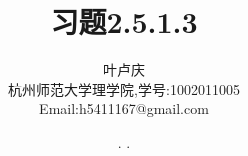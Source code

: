 \documentclass[a4paper, 12pt]{article} %
\makeatletter
\renewcommand{\maketitle}{ %
  \renewcommand\refname{参考文献}
  \newcommand{\D}{\displaystyle}\newcommand{\ri}{\Rightarrow}
  \newcommand{\ds}{\displaystyle} \renewcommand{\ni}{\noindent}
  \newcommand{\pa}{\partial} \newcommand{\Om}{\Omega}
  \newcommand{\om}{\omega} \newcommand{\sik}{\sum_{i=1}^k}
  \newcommand{\vov}{\Vert\omega\Vert} \newcommand{\Umy}{U_{\mu_i,y^i}}
  \newcommand{\lamns}{\lambda_n^{^{\scriptstyle\sigma}}}
  \newcommand{\chiomn}{\chi_{_{\Omega_n}}}
  \newcommand{\ullim}{\underline{\lim}} \newcommand{\bsy}{\boldsymbol}
  \newcommand{\mvb}{\mathversion{bold}} \newcommand{\la}{\lambda}
  \newcommand{\La}{\Lambda} \newcommand{\va}{\varepsilon}
  \newcommand{\be}{\beta} \newcommand{\al}{\alpha}
  \newcommand{\dis}{\displaystyle} \newcommand{\R}{{\mathbb R}}
  \newcommand{\N}{{\mathbb N}} \newcommand{\cF}{{\mathcal F}}
  \newcommand{\gB}{{\mathfrak B}} \newcommand{\eps}{\epsilon}
  \begin{flushright} %
    {\LARGE\@title} %
    
    \vspace{50pt} %
    
    {\large\@author} %
    \\\@date %
    
    \vspace{40pt} %
  \end{flushright}
}
\makeatother
\begin{document}
\title{\textbf{习题2.5.1.3}} 
\author{\small{叶卢庆}\\{\small{杭州师范大学理学院,学号:1002011005}}\\{\small{Email:h5411167@gmail.com}}} %
\renewcommand{\today}{\number\year. \number\month. \number\day}
\date{\today} %



\maketitle %






\end{document}
